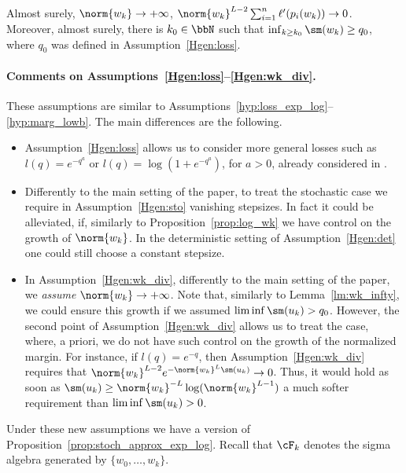 \begin{assumption}\label{Hgen:wk_div}
  Almost surely, $\norm{w_k} \rightarrow + \infty$, $\norm{w_k}^{L-2} \sum_{i=1}^n \ell'(p_i(w_k)) \rightarrow 0$.
  Moreover, almost surely, there is $k_0 \in\bbN$ such that $\inf_{k \geq k_0}\sm(w_k)\geq q_0$, where $q_0$ was defined in Assumption~\ref{Hgen:loss}.
\end{assumption}

\paragraph{Comments on Assumptions~\ref{Hgen:loss}--\ref{Hgen:wk_div}.} These assumptions are similar to Assumptions~\ref{hyp:loss_exp_log}--\ref{hyp:marg_lowb}. The main differences are the following. 

\begin{itemize}
  \item Assumption~\ref{Hgen:loss} allows us to consider more general losses such as $l(q) = e^{-q^a}$ or $l(q) =\log (1+e^{-q^a})$, for $a>0$, already considered in \cite{Lyu_Li_maxmargin}.
  \item Differently to the main setting of the paper, to treat the stochastic case we require in Assumption~\ref{Hgen:sto} vanishing stepsizes. In fact it could be alleviated, if, similarly to Proposition~\ref{prop:log_wk} we have control on the growth of $\norm{w_k}$. In the deterministic setting of Assumption~\ref{Hgen:det} one could still choose a constant stepsize.
  \item In Assumption~\ref{Hgen:wk_div}, differently to the main setting of the paper, we \emph{assume} $\norm{w_k} \rightarrow + \infty$. Note that, similarly to Lemma~\ref{lm:wk_infty}, we could ensure this growth if we assumed $\liminf \sm(u_k) >q_0$. However, the second point of Assumption~\ref{Hgen:wk_div} allows us to treat the case, where, a priori, we do not have such control on the growth of the normalized margin. For instance, if $l(q) = e^{-q}$, then Assumption~\ref{Hgen:wk_div} requires that $\norm{w_k}^{L-2}e^{-\norm{w_k}^L \sm(u_k)} \rightarrow 0$. Thus, it would hold as soon as $\sm(u_k) \geq \norm{w_k}^{-L}\log(\norm{w_k}^{L-1})$ a much softer requirement than $\liminf \sm(u_k) >0$. 
\end{itemize}

Under these new assumptions we have a version of Proposition~\ref{prop:stoch_approx_exp_log}. Recall that $\cF_k$ denotes the sigma algebra generated by $\{w_0, \ldots, w_k \}$.


